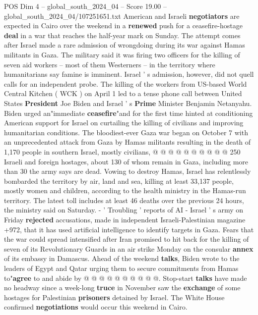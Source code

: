 \begin{textsample}{POS Dim 4 – global\_south\_2024\_04 – Score 19.00 – global\_south\_2024\_04/107251651.txt}  \label{ex:f4_pos_270}
American and Israeli \textbf{negotiators} are expected in Cairo over the weekend in a \textbf{renewed} push for a ceasefire-hostage \textbf{deal} in a war that reaches the half-year mark on Sunday.
The attempt comes after Israel made a rare admission of wrongdoing during its war against Hamas militants in Gaza.
The military said it was firing two officers for the killing of seven aid workers -- most of them Westerners -- in the territory where humanitarians say famine is imminent.
Israel ' s admission, however, did not quell calls for an independent probe.
The killing of the workers from US-based World Central Kitchen ( WCK ) on April 1 led to a tense phone call between United States \textbf{President} Joe Biden and Israel ' s \textbf{Prime} Minister Benjamin Netanyahu.
Biden urged an"immediate \textbf{ceasefire}"and for the first time hinted at conditioning American support for Israel on curtailing the killing of civilians and improving humanitarian conditions.
The bloodiest-ever Gaza war began on October 7 with an unprecedented attack from Gaza by Hamas militants resulting in the death of 1,170 people in southern Israel, mostly civilians, @ @ @ @ @ @ @ @ @ @ 250 Israeli and foreign hostages, about 130 of whom remain in Gaza, including more than 30 the army says are dead.
Vowing to destroy Hamas, Israel has relentlessly bombarded the territory by air, land and sea, killing at least 33,137 people, mostly women and children, according to the health ministry in the Hamas-run territory.
The latest toll includes at least 46 deaths over the previous 24 hours, the ministry said on Saturday. - ' Troubling ' reports of AI - Israel ' s army on Friday \textbf{rejected} accusations, made in independent Israeli-Palestinian magazine +972, that it has used artificial intelligence to identify targets in Gaza.
Fears that the war could spread intensified after Iran promised to hit back for the killing of seven of its Revolutionary Guards in an air strike Monday on the consular \textbf{annex} of its embassy in Damascus.
Ahead of the weekend \textbf{talks}, Biden wrote to the leaders of Egypt and Qatar urging them to secure commitments from Hamas to"\textbf{agree} to and abide by @ @ @ @ @ @ @ @ @ @.
Stop-start \textbf{talks} have made no headway since a week-long \textbf{truce} in November saw the \textbf{exchange} of some hostages for Palestinian \textbf{prisoners} detained by Israel.
The White House confirmed \textbf{negotiations} would occur this weekend in Cairo.

\end{textsample}
